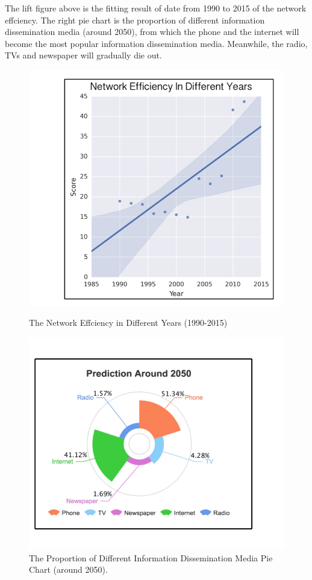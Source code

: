 \documentclass[a4paper,11pt]{article}
\begin{document}
\par The lift figure above is the fitting result of date from 1990 to 2015\cite{RK} of the network effciency. The right  pie chart is the proportion of different information dissemination media (around 2050), from which the phone and the internet will become the most popular information dissemination media. Meanwhile, the radio, TVs and newspaper will gradually die out.


\begin{figure}[!h]
  \centering %
  \begin{minipage}[t]{.49\linewidth}
  \includegraphics[width=1\textwidth]{./Pic/P3_.png}
  \caption{The Network Effciency in Different Years (1990-2015)}
  \end{minipage}
  \begin{minipage}[t]{.49\linewidth}
  \includegraphics[width=1\textwidth]{./Pic/P3.png}
  \caption{The Proportion of Different Information Dissemination Media Pie Chart (around 2050).}
  \end{minipage}
\end{figure}
\end{document}
